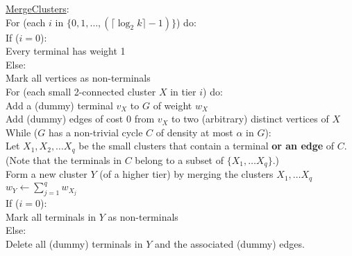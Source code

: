 \documentclass[11pt]{article}
\newcommand{\assign}{\leftarrow}
\newcommand{\ceil}[1]{\lceil #1 \rceil}
\begin{document}
\begin{algo}
\underline{\sc MergeClusters}:\\
For (each $i$ in $\{0, 1, \dots, \left(\ceil{\log_2 k} - 1 \right)\}$) do: \+ \\
    If ($i = 0$): \+ \\
        Every terminal has weight 1 \- \\
    Else: \+ \\
        Mark all vertices as non-terminals \\
        For (each small 2-connected cluster $X$ in tier $i$) do: \+ \\
             Add a (dummy) terminal $v_X$ to $G$ of weight $w_X$ \\
             Add (dummy) edges of cost 0 from $v_X$ to two (arbitrary) distinct vertices of $X$ \- \- \\

    While ($G$ has a non-trivial cycle $C$ of density at most $\alpha$ in $G$): \+ \\
        Let $X_1, X_2, \ldots X_q$ be the small clusters that contain a terminal
           {\bf or an edge} of $C$.\\
        (Note that the terminals in $C$ belong to a subset of $\{X_1, \ldots X_q\}$.)\\
        Form a new cluster $Y$ (of a higher tier) by merging the clusters $X_1, \ldots X_q$\\
        $w_Y \assign \sum_{j=1}^q w_{X_j}$ \\
        If ($i = 0$): \+ \\
            Mark all terminals in $Y$ as non-terminals \- \\
        Else: \+ \\
            Delete all (dummy) terminals in $Y$ and the associated (dummy) edges.
\end{algo}
\end{document}
